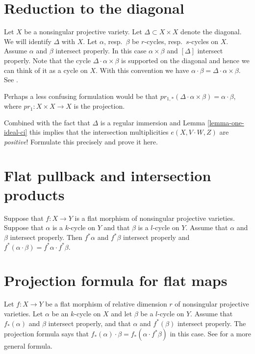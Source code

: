 \section{Reduction to the diagonal}
\label{section-reduction-diagonal}

\noindent
Let $X$ be a nonsingular projective
variety. Let $\Delta \subset X \times X$ denote the diagonal. 
We will identify $\Delta$ with $X$.
Let $\alpha$, resp.\ $\beta$ be $r$-cycles, resp.\ $s$-cycles
on $X$. Assume $\alpha$ and $\beta$ intersect properly. In this case
$\alpha \times \beta$ and $[\Delta]$ intersect properly. Note that
the cycle $\Delta \cdot \alpha\times\beta$ is supported on the diagonal
and hence we can think of it as a cycle on $X$. With this convention
we have $\alpha \cdot \beta = \Delta \cdot \alpha\times\beta$.
See \cite[Chapter V]{Serre_algebre_locale}. 

\medskip\noindent
Perhaps a less confusing formulation would be that
$pr_{1,*}( \Delta \cdot \alpha\times\beta ) = \alpha\cdot\beta$,
where $pr_1 : X\times X \to X$ is the projection.

\medskip\noindent
Combined with the fact that $\Delta$ is a regular immersion
and Lemma \ref{lemma-one-ideal-ci} this implies that the
intersection multiplicities $e(X, V \cdot W, Z)$ are {\it positive}!
Formulate this precisely and prove it here.



\section{Flat pullback and intersection products}
\label{section-flat-pullback-and-intersection-products}

\noindent
Suppose that $f : X \to Y$ is a flat morphism of nonsingular
projective varieties. Suppose that $\alpha$ is a $k$-cycle
on $Y$ and that $\beta$ is a $l$-cycle on $Y$. Assume that
$\alpha$ and $\beta$ intersect properly. Then $f^*\alpha$
and $f^*\beta$ intersect properly and $f^*( \alpha \cdot \beta )
= f^*\alpha \cdot f^*\beta$.

\section{Projection formula for flat maps}
\label{section-projection-formula-flat}

\noindent
Let $f : X \to Y$ be a flat morphism
of relative dimension $r$ of nonsingular projective varieties.
Let $\alpha$ be an $k$-cycle on $X$ and let $\beta$ be a $l$-cycle
on $Y$. Assume that $f_*(\alpha)$ and $\beta$ intersect properly,
and that $\alpha$ and $f^*(\beta)$ intersect properly. The projection
formula says that $f_*(\alpha) \cdot \beta =
f_*( \alpha \cdot f^*\beta)$ in this case.
See \cite[Chapter V, Section 7, formula (10)]{Serre_algebre_locale}
for a more general formula. 

